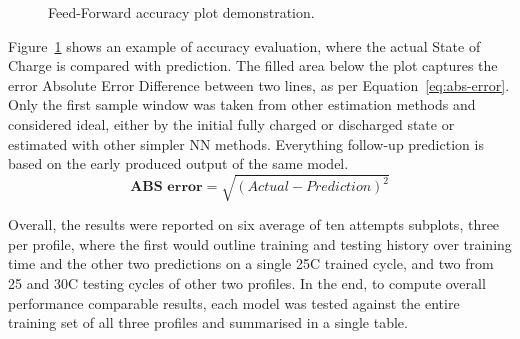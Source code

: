 %
%
 {
\begin{figure}[ht]
    \centering
    
    \caption{Feed-Forward accuracy plot demonstration.}
    \label{fig:plot_demo}
\end{figure}
Figure~\ref{fig:plot_demo} shows an example of accuracy evaluation, where the actual State of Charge is compared with prediction.
The filled area below the plot captures the error Absolute Error Difference between two lines, as per Equation~\ref{eq:abs-error}.
Only the first sample window was taken from other estimation methods and considered ideal, either by the initial fully charged or discharged state or estimated with other simpler NN methods.
Everything follow-up prediction is based on the early produced output of the same model.
\begin{equation}
    \textbf{ABS error}  = \sqrt{(Actual-Prediction)^2}
    \label{eq:abs-error}
\end{equation}
}
Overall, the results were reported on six average of ten attempts subplots, three per profile, where the first would outline training and testing history over training time and the other two predictions on a single 25\textdegree{}C trained cycle, and two from 25 and 30\textdegree{}C testing cycles of other two profiles.
In the end, to compute overall performance comparable results, each model was tested against the entire training set of all three profiles and summarised in a single table.
